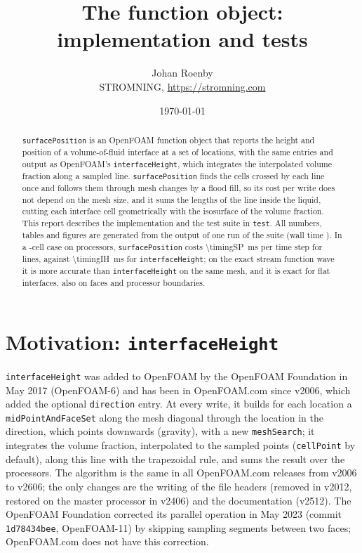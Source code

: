 \documentclass[11pt,a4paper]{article}
\title{The \sP{} function object:\\ implementation and tests}
\author{Johan Roenby\\ STROMNING, \url{https://stromning.com}}
\date{\today}
\newcommand{\sP}{\texttt{surfacePosition}}
\newcommand{\iH}{\texttt{interfaceHeight}}
\begin{document}
\maketitle

\begin{abstract}
\noindent \sP{} is an OpenFOAM function object that reports the height and
position of a volume-of-fluid interface at a set of locations, with the same
entries and output as OpenFOAM's \iH{}, which integrates the interpolated
volume fraction along a sampled line. \sP{} finds the cells crossed by each
line once and follows them through mesh changes by a flood fill, so its cost
per write does not depend on the mesh size, and it sums the lengths of the
line inside the liquid, cutting each interface cell geometrically with the
isosurface of the volume fraction. This report describes the implementation
and the test suite in \texttt{test}. All numbers, tables and figures are
generated from the output of one run of the suite (wall time \suiteTime). In a
\timingCells-cell case on \timingProcs{} processors, \sP{} costs
\SI{\timingSP}{ms} per time step for \timingLines{} lines, against
\SI{\timingIH}{ms} for \iH{}; on the exact stream function wave it is more
accurate than \iH{} on the same mesh, and it is exact for flat interfaces,
also on faces and processor boundaries.
\end{abstract}

\section{Motivation: \iH{}}
\label{sec:motivation}

\iH{} was added to OpenFOAM by the OpenFOAM Foundation in May 2017
(OpenFOAM-6) and has been in OpenFOAM.com since v2006, which added the
optional \texttt{direction} entry. At every write, it builds for each location
a \texttt{midPointAndFaceSet} along the mesh diagonal through the location in
the direction, which points downwards (gravity), with a new
\texttt{meshSearch}; it integrates the volume fraction, interpolated to the
sampled points (\texttt{cellPoint} by default), along this line with the
trapezoidal rule, and sums the result over the processors. The algorithm is
the same in all OpenFOAM.com releases from v2006 to v2606; the only changes
are the writing of the file headers (removed in v2012, restored on the master
processor in v2406) and the documentation (v2512). The OpenFOAM Foundation
corrected its parallel operation in May 2023 (commit \texttt{1d78434bee},
OpenFOAM-11) by skipping sampling segments between two faces; OpenFOAM.com
does not have this correction.
\end{document}
